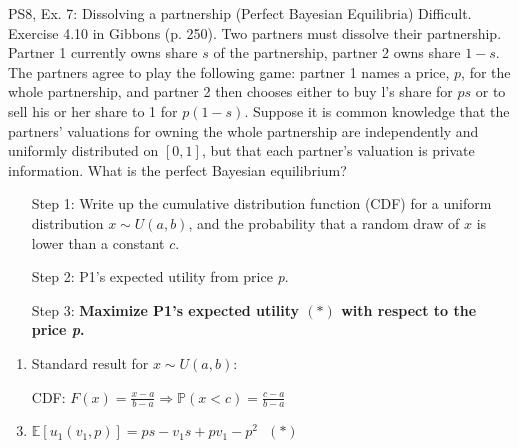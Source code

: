 \begin{frame}{PS8, Ex. 7: Dissolving a partnership (Perfect Bayesian Equilibria)}
    Difficult. Exercise 4.10 in Gibbons (p. 250). Two partners must dissolve their partnership. Partner 1 currently owns share $s$ of the partnership, partner 2 owns share $1-s$. The partners agree to play the following game: partner 1 names a price, $p$, for the whole partnership, and partner 2 then chooses either to buy l's share for $ps$ or to sell his or her share to 1 for $p(1-s)$. Suppose it is common knowledge that the partners' valuations for owning the whole partnership are independently and uniformly distributed on $[0,1]$, but that each partner's valuation is private information. What is the perfect Bayesian equilibrium?\vspace{-11pt}
    \begin{multicols}{2}
      \begin{itemize}
        \item[Step 1:] Write up the cumulative distribution function (CDF) for a uniform distribution $x\sim U(a, b)$, and the probability that a random draw of $x$ is lower than a constant $c$.
        \item[Step 2:] P1's expected utility from price \textit{p}.
        \item[Step 3:] \textbf{Maximize P1's expected utility $(*)$ with respect to the price \textit{p}.}
      \end{itemize}\vspace{-8pt}
      \vfill\null\columnbreak
      \begin{enumerate}
        \item Standard result for $x\sim U(a, b):$
        \item[CDF:] $F(x)=\frac{x-a}{b-a}\Rightarrow\mathbb{P}(x<c)=\frac{c-a}{b-a}$
        \item $\mathbb{E}[u_1(v_1,p)]=ps-v_1s+pv_1-p^2\ \ \ (*)$
      \end{enumerate}
      \vfill\null
    \end{multicols}
\end{frame}
